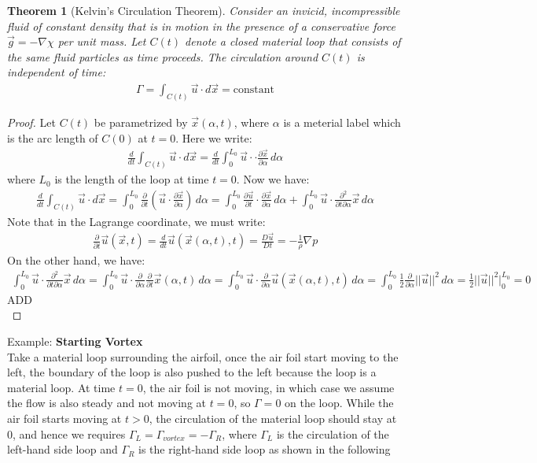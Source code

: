 \documentclass[11pt]{book}
\theoremstyle{break}
\theoremstyle{break}
\newtheorem{thm}{Theorem}[section]
\newcommand{\pd}{\partial}
\newcommand{\example}{\color{green}Example: \color{black}}
\begin{document}
\begin{thm}[Kelvin's Circulation Theorem]
Consider an invicid, incompressible fluid of constant density that is in motion in the presence of a conservative force $\vec{g} = -\nabla \chi$ per unit mass. Let $C(t)$ denote a closed material loop that consists of the same fluid particles as time proceeds. The circulation around $C(t)$ is independent of time:
\begin{align*}
\Gamma = \int_{C(t)} \vec{u}\cdot d\vec{x} = \text{constant}
\end{align*} 
\end{thm}
\begin{proof}
Let $C(t)$ be parametrized by $\vec{x}(\alpha, t)$, where $\alpha$ is a meterial label which is the arc length of $C(0)$ at $t=0$. Here we write:
\begin{align*}
\frac{d}{dt}\int_{C(t)}\vec{u}\cdot d\vec{x} = \frac{d}{dt}\int_{0}^{L_0}\vec{u}\cdot \cdot \frac{\pd\vec{x}}{\pd\alpha}\, d\alpha 
\end{align*}
where $L_0$ is the length of the loop at time $t=0$. Now we have:
\begin{align*}
\frac{d}{dt}\int_{C(t)}\vec{u}\cdot d\vec{x} = \int_0^{L_0}  \frac{\partial}{\partial t}\left( \vec{u} \cdot \frac{\pd \vec{x}}{\pd \alpha}\right) \, d\alpha = \int_0^{L_0} \frac{\partial \vec{u}}{\partial t} \cdot \frac{\partial \vec{x}}{\partial \alpha}\, d\alpha + \int_0^{L_0}\vec{u} \cdot \frac{\partial^2}{\pd t \pd \alpha} \vec{x} \, d\alpha
\end{align*}
Note that in the Lagrange coordinate, we must write:
\begin{align*}
 \frac{\partial }{\partial t}\vec{u}(\vec{x},t)  = \frac{d}{d t} \vec{u}(\vec{x}(\alpha,t) ,t) = \frac{D\vec{u}}{Dt} = -\frac{1}{\rho}\nabla p 
\end{align*}
On the other hand, we have:
\begin{align*}
\int_0^{L_0}\vec{u} \cdot \frac{\partial^2}{\pd t \pd \alpha} \vec{x} \, d\alpha = \int_0^{L_0}\vec{u}\cdot \frac{\pd }{\pd \alpha}\frac{\pd}{\pd t} \vec{x}(\alpha,t) \, d\alpha = \int_0^{L_0}\vec{u}\cdot \frac{\pd }{\pd \alpha}\vec{u}(\vec{x}(\alpha, t),t)\, d\alpha =\int_0^{L_0}\frac{1}{2}\frac{\pd}{\pd\alpha} ||\vec{u}||^2 \, d\alpha  = \frac{1}{2}||\vec{u}||^2 |_{0}^{L_0} = 0
\end{align*}
ADD\\
\end{proof}



\example \textbf{Starting Vortex}\\
Take a material loop surrounding the airfoil, once the air foil start moving to the left, the boundary of the loop is also pushed to the left because the loop is a material loop. At time $t=0$, the air foil is not moving, in which case we assume the flow is also steady and not moving at $t=0$, so $\Gamma = 0$ on the loop. While the air foil starts moving at $t>0$, the circulation of the material loop should stay at $0$, and hence we requires $\Gamma_{L} = \Gamma_{vortex} = -\Gamma_{R}$, where $\Gamma_L$ is the circulation of the left-hand side loop and $\Gamma_R$ is the right-hand side loop as shown in the following\\
\end{document}
